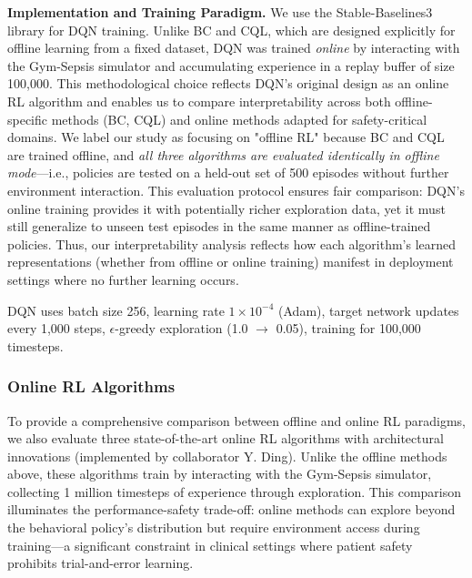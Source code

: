 \textbf{Implementation and Training Paradigm.} We use the Stable-Baselines3 library for DQN training. Unlike BC and CQL, which are designed explicitly for offline learning from a fixed dataset, DQN was trained \textit{online} by interacting with the Gym-Sepsis simulator and accumulating experience in a replay buffer of size 100,000. This methodological choice reflects DQN's original design as an online RL algorithm \citep{mnih2015dqn} and enables us to compare interpretability across both offline-specific methods (BC, CQL) and online methods adapted for safety-critical domains. We label our study as focusing on "offline RL" because BC and CQL are trained offline, and \textit{all three algorithms are evaluated identically in offline mode}—i.e., policies are tested on a held-out set of 500 episodes without further environment interaction. This evaluation protocol ensures fair comparison: DQN's online training provides it with potentially richer exploration data, yet it must still generalize to unseen test episodes in the same manner as offline-trained policies. Thus, our interpretability analysis reflects how each algorithm's learned representations (whether from offline or online training) manifest in deployment settings where no further learning occurs.

DQN uses batch size 256, learning rate $1 \times 10^{-4}$ (Adam), target network updates every 1,000 steps, $\epsilon$-greedy exploration (1.0 $\to$ 0.05), training for 100,000 timesteps.

\subsubsection{Online RL Algorithms}\label{sec:methods:algos:online}

To provide a comprehensive comparison between offline and online RL paradigms, we also evaluate three state-of-the-art online RL algorithms with architectural innovations (implemented by collaborator Y. Ding). Unlike the offline methods above, these algorithms train by interacting with the Gym-Sepsis simulator, collecting 1 million timesteps of experience through exploration. This comparison illuminates the performance-safety trade-off: online methods can explore beyond the behavioral policy's distribution but require environment access during training—a significant constraint in clinical settings where patient safety prohibits trial-and-error learning.

